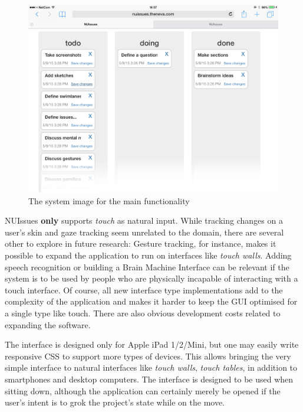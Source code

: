 \begin{figure}[H]
    \centerline{\includegraphics[scale=0.4]{images/nuissues-screenshots/01-default-all-swimlanes}}
    \caption{The system image for the main functionality}
    \label{figure:ipad-default-simple-screenshots}  
\end{figure}

NUIssues \textbf{only} supports \textit{touch} as natural input. While tracking changes on a user's skin and gaze tracking seem unrelated to the domain, there are several other to explore in future research: Gesture tracking, for instance, makes it possible to expand the application to run on interfaces like \textit{touch walls}. Adding speech recognition or building a Brain Machine Interface can be relevant if the system is to be used by people who are physically incapable of interacting with a touch interface. Of course, all new interface type implementations add to the complexity of the application and makes it harder to keep the GUI optimised for a single type like touch. There are also obvious development costs related to expanding the software.

The interface is designed only for Apple iPad 1/2/Mini, but one may easily write responsive CSS to support more types of devices. This allows bringing the very simple interface to natural interfaces like \textit{touch walls}, \textit{touch tables}, in addition to smartphones and desktop computers. The interface is designed to be used when sitting down, although the application can certainly merely be opened if the user's intent is to grok the project's state while on the move.

